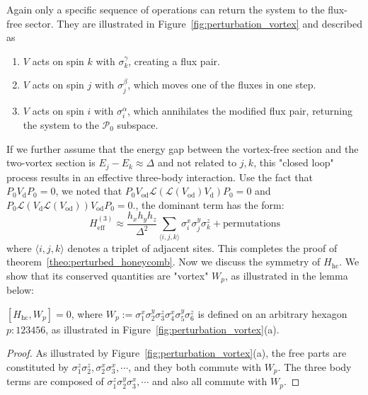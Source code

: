 Again only a specific sequence of operations can return the system to the flux-free sector. 
They are illustrated in Figure~\ref{fig:perturbation_vortex} and described as
\begin{enumerate}
    \item $V$ acts on spin $k$ with $\sigma_k^\gamma$, creating a flux pair.
    \item $V$ acts on spin $j$ with $\sigma_j^\beta$, which moves one of the fluxes in one step.
    \item $V$ acts on spin $i$ with $\sigma_i^\alpha$, which annihilates the modified flux pair, returning the system to the $\mathcal{P}_0$ subspace.
\end{enumerate}
If we further assume that the energy gap between the vortex-free section and the two-vortex section is  $E_j - E_k \approx \Delta $  and not related to $j,k$, this "closed loop" process results in an effective three-body interaction. Use the fact that $P_0V_{\mathrm{d}}P_0=0$, we noted that $P_0V_{\mathrm{od}} \mathcal{L}(\mathcal{L}(V_{\mathrm{od}})V_{\mathrm{d}})P_0=0$ and $P_0\mathcal{L}(V_{\mathrm{d}} \mathcal{L}(V_{\mathrm{od}}))V_{\mathrm{od}} P_0= 0$., the dominant term has the form:
\begin{equation}
    H_{\mathrm{eff}}^{(3)} \approx \frac{h_x h_y h_z}{\Delta^2} \sum_{\langle i,j,k \rangle} \sigma_i^x \sigma_j^y \sigma_k^z + \text{permutations}
\end{equation}
where $\langle i,j,k \rangle$ denotes a triplet of adjacent sites. This completes the proof of theorem~\ref{theo:perturbed_honeycomb}.
Now we discuss the symmetry of $H_{\text{hc}}$. We show that its conserved quantities are "vortex" $W_p$, as illustrated in the lemma below:
\begin{lemma}\label{lemma:conserve_W}
    $[H_{\mathrm{hc}}, W_p] = 0$, where $W_p := \sigma_1^x \sigma_2^y \sigma_3^z \sigma_4^x\sigma_5^y \sigma_6^z$ is defined on an arbitrary hexagon $p:123456$, as illustrated in Figure~\ref{fig:perturbation_vortex}(a). 
\end{lemma}
\begin{proof}
    As illustrated by Figure~\ref{fig:perturbation_vortex}(a), the free parts are constituted by $\sigma_1^z\sigma_2^z,\sigma_2^x\sigma_3^x, \cdots$, and they both commute with $W_p$. The three body terms are composed of $\sigma_1^z\sigma_2^y\sigma_3^x,\cdots$ and also all commute with $W_p$.
\end{proof}
